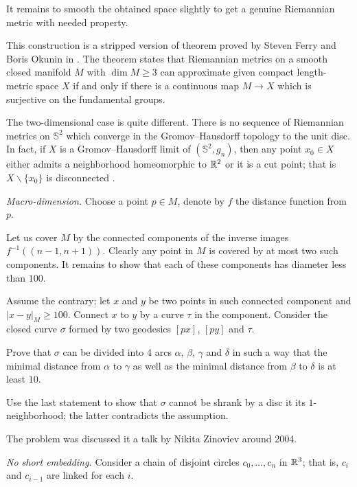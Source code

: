 It remains to smooth the obtained space slightly 
to get a genuine Riemannian metric with needed property.

This construction is a stripped version of theorem proved by Steven Ferry and Boris Okunin in \cite{ferry-okun}.
The theorem states that Riemannian metrics on a smooth closed manifold $M$ with $\dim M\ge 3$ 
can approximate given compact length-metric space $X$ 
if and only if 
there is a continuous map $M\to X$
which is surjective on the fundamental groups. 

The two-dimensional case is quite different.
There is no sequence of Riemannian metrics on
$\mathbb{S}^2$ which converge in the Gromov--Hausdorff topology to the unit disc.
In fact, 
if $X$ is a Gromov--Hausdorff limit of $(\mathbb{S}^2,g_n)$,
then any point $x_0\in X$ either admits a neighborhood homeomorphic to $\mathbb{R}^2$ or it is a cut point;
that is $X\backslash\{x_0\}$ is disconnected \cite[see 3.32 in][]{gromov-MetStr}.

\textit{Macro-dimension.}
Choose a point $p\in M$,
denote by $f$ the distance function from $p$.

Let us cover $M$ by the connected components of the inverse images 
$f^{-1}((n-1,n+1))$.
Clearly any point in $M$ is covered by at most two such components.
It remains to show that each of these components has diameter less than $100$.

Assume the contrary; let $x$ and $y$ be two points in such connected component 
and $|x-y|_M\ge 100$.
Connect $x$ to $y$ by a curve $\tau$ in the component.
Consider the closed curve $\sigma$ formed by two geodesics $[px]$, $[py]$ and $\tau$.


Prove that $\sigma$ can be divided into 4 arcs $\alpha$, $\beta$, $\gamma$ and $\delta$
in such a way that the minimal distance from $\alpha$ to $\gamma$ as well as the minimal distance from $\beta$ to $\delta$ is at least $10$.

Use the last statement to show that $\sigma$ 
cannot be shrank 
by a disc it its $1$-neighborhood;
the latter contradicts the assumption.

The problem was discussed it a talk by Nikita Zinoviev around 2004.


\textit{No short embedding.}
Consider a chain of disjoint circles $c_0,\dots,c_n$ in $\mathbb{R}^3$;
that is, $c_i$ and $c_{i-1}$ are linked for each $i$. 


